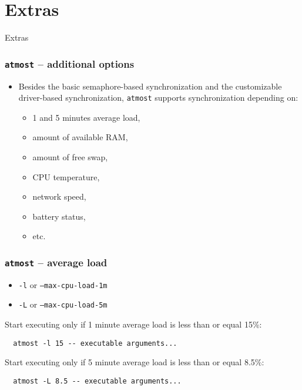 \documentclass[compress,table,xcolor=table]{beamer}
\newcommand{\shelltext}[1]{\texttt{\colorbox{light-gray}{#1}}}
\begin{document}
\section{Extras}
\begin{frame}
  \centering
  \Huge
  Extras
\end{frame}
\begin{frame}
  \frametitle{\shelltext{atmost} -- additional options}
  \begin{itemize}
    \Large
    \item Besides the basic semaphore-based synchronization and the customizable
      driver-based synchronization, \shelltext{atmost} supports synchronization
      depending on:
    \begin{itemize}
      \large
      \item 1 and 5 minutes average load,
      \item amount of available RAM,
      \item amount of free swap,
      \item CPU temperature,
      \item network speed,
      \item battery status,
      \item etc.
    \end{itemize}
  \end{itemize}
\end{frame}
\begin{frame}[fragile]
  \frametitle{\shelltext{atmost} -- average load}
  \begin{itemize}
    \item \shelltext{-l} or \shelltext{--max-cpu-load-1m}
    \item \shelltext{-L} or \shelltext{--max-cpu-load-5m}
  \end{itemize}

  \large
  Start executing only if 1 minute average load is less than or equal 15\%:
  \normalsize
  \begin{verbatim}
  atmost -l 15 -- executable arguments...
  \end{verbatim}

  \large
  Start executing only if 5 minute average load is less than or equal 8.5\%:
  \normalsize
  \begin{verbatim}
  atmost -L 8.5 -- executable arguments...
  \end{verbatim}
\end{frame}
\end{document}
